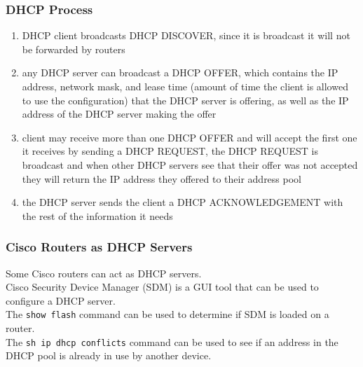 \subsubsection{DHCP Process}

\begin{enumerate}

\item DHCP client broadcasts DHCP DISCOVER, since it is broadcast it will not
be forwarded by routers

\item any DHCP server can broadcast a DHCP OFFER, which contains the IP
address, network mask, and lease time (amount of time the client is allowed to
use the configuration) that the DHCP server is offering, as well as the IP
address of the DHCP server making the offer

\item client may receive more than one DHCP OFFER and will accept the first
one it receives by sending a DHCP REQUEST, the DHCP REQUEST is broadcast and
when other DHCP servers see that their offer was not accepted they will
return the IP address they offered to their address pool

\item the DHCP server sends the client a DHCP ACKNOWLEDGEMENT with the rest of
the information it needs

\end{enumerate}

\subsubsection{Cisco Routers as DHCP Servers}

Some Cisco routers can act as DHCP servers.\\

Cisco Security Device Manager (SDM) is a GUI tool that can be used to
configure a DHCP server.\\

The \texttt{show flash} command can be used to determine if SDM is loaded on
a router.\\

The \texttt{sh ip dhcp conflicts} command can be used to see if an address
in the DHCP pool is already in use by another device.
